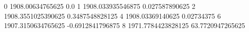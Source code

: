 0 1908.00634765625 0.0
1 1908.033935546875 0.027587890625
2 1908.3551025390625 0.3487548828125
4 1908.03369140625 0.02734375
6 1907.3150634765625 -0.6912841796875
8 1971.7784423828125 63.7720947265625
